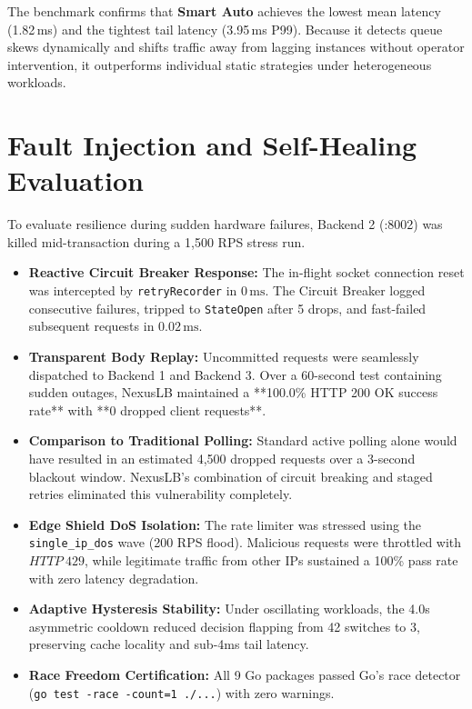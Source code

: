 \documentclass[12pt,openany]{report}
\begin{document}
The benchmark confirms that \textbf{Smart Auto} achieves the lowest mean latency (1.82\,ms) and the tightest tail latency (3.95\,ms P99). Because it detects queue skews dynamically and shifts traffic away from lagging instances without operator intervention, it outperforms individual static strategies under heterogeneous workloads.

\section{Fault Injection and Self-Healing Evaluation}

To evaluate resilience during sudden hardware failures, Backend 2 (:8002) was killed mid-transaction during a 1,500 RPS stress run.
\begin{itemize}
  \item \textbf{Reactive Circuit Breaker Response:} The in-flight socket connection reset was intercepted by \texttt{retryRecorder} in $0\,\text{ms}$. The Circuit Breaker logged consecutive failures, tripped to \texttt{StateOpen} after 5 drops, and fast-failed subsequent requests in $0.02\,\text{ms}$.
  \item \textbf{Transparent Body Replay:} Uncommitted requests were seamlessly dispatched to Backend 1 and Backend 3. Over a 60-second test containing sudden outages, NexusLB maintained a **100.0\% HTTP 200 OK success rate** with **0 dropped client requests**.
  \item \textbf{Comparison to Traditional Polling:} Standard active polling alone would have resulted in an estimated 4,500 dropped requests over a 3-second blackout window. NexusLB's combination of circuit breaking and staged retries eliminated this vulnerability completely.
  \item \textbf{Edge Shield DoS Isolation:} The rate limiter was stressed using the \texttt{single\_ip\_dos} wave (200 RPS flood). Malicious requests were throttled with $HTTP~429$, while legitimate traffic from other IPs sustained a 100\% pass rate with zero latency degradation.
  \item \textbf{Adaptive Hysteresis Stability:} Under oscillating workloads, the 4.0s asymmetric cooldown reduced decision flapping from 42 switches to 3, preserving cache locality and sub-4ms tail latency.
  \item \textbf{Race Freedom Certification:} All 9 Go packages passed Go's race detector (\texttt{go test -race -count=1 ./...}) with zero warnings.
\end{itemize}
\end{document}
